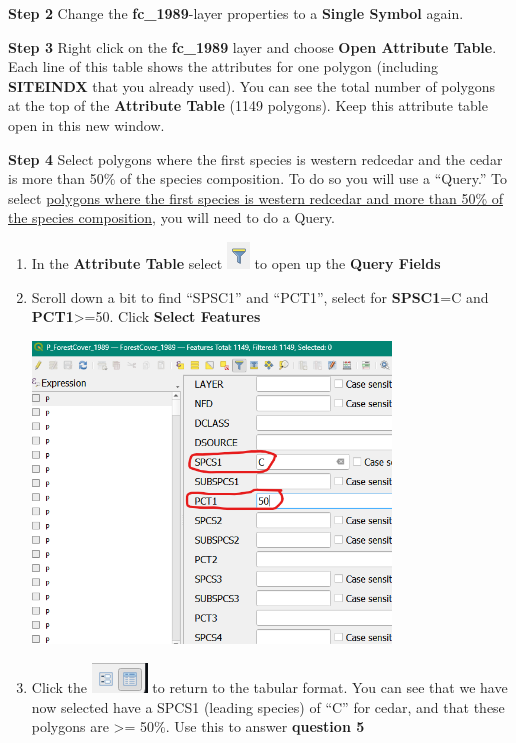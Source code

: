 \documentclass[
  letterpaper,
]{book}
\begin{document}
\textbf{Step 2} Change the \textbf{fc\_1989}-layer properties to a
\textbf{Single Symbol} again.

\textbf{Step 3} Right click on the \textbf{fc\_1989} layer and choose
\textbf{Open Attribute Table}. Each line of this table shows the
attributes for one polygon (including \textbf{SITEINDX} that you already
used). You can see the total number of polygons at the top of the
\textbf{Attribute Table} (1149 polygons). Keep this attribute table open
in this new window.

\textbf{Step 4} Select polygons where the first species is western
redcedar and the cedar is more than 50\% of the species composition. To
do so you will use a ``Query.'' To select \ul{polygons where the first
species is western redcedar and more than 50\% of the species
composition,} you will need to do a Query.

\begin{enumerate}
\def\labelenumi{\Alph{enumi}.}
\item
  In the \textbf{Attribute Table} select
  \includegraphics{images/clipboard-3366763250.png} to open up the
  \textbf{Query Fields}
\item
  Scroll down a bit to find ``SPSC1'' and ``PCT1'', select for
  \textbf{SPSC1}=C and \textbf{PCT1}\textgreater=50. Click
  \textbf{Select Features}

  \includegraphics[width=3.75in,height=\textheight]{images/clipboard-1889425914.png}
\item
  Click the \includegraphics{images/clipboard-633541715.png} to return
  to the tabular format. You can see that we have now selected have a
  SPCS1 (leading species) of ``C'' for cedar, and that these polygons
  are \textgreater= 50\%. Use this to answer \textbf{question 5}
\end{enumerate}
\end{document}
